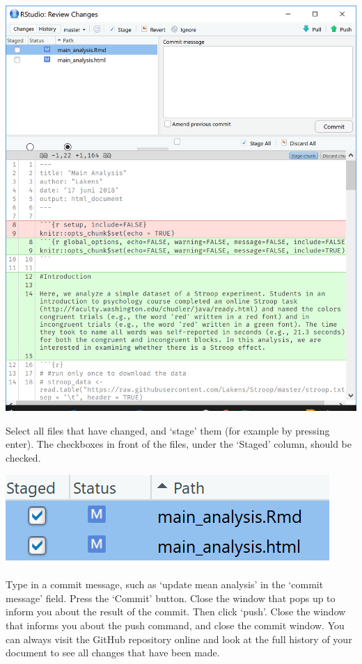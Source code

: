 \documentclass[
  oneside]{krantz}
\begin{document}
\begin{center}\includegraphics[width=1\linewidth]{images/045aa0f44f3615a30aeaac241042fa3a} \end{center}

Select all files that have changed, and `stage' them (for example by pressing
enter). The checkboxes in front of the files, under the `Staged' column, should
be checked.

\begin{center}\includegraphics[width=1\linewidth]{images/3d314b695f0d424b8792e4d179f6f4d3} \end{center}

Type in a commit message, such as `update mean analysis' in the `commit message'
field. Press the `Commit' button. Close the window that pops up to inform you
about the result of the commit. Then click `push'. Close the window that informs
you about the push command, and close the commit window. You can always visit
the GitHub repository online and look at the full history of your document to
see all changes that have been made.
\end{document}
